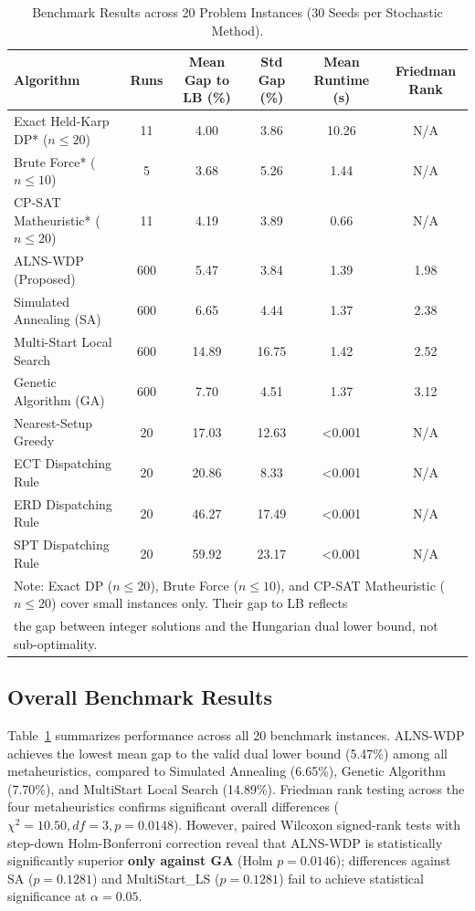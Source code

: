 \documentclass[journal]{IEEEtran}
\begin{document}
\begin{table}[htbp]
\centering
\small
\caption{Benchmark Results across 20 Problem Instances (30 Seeds per Stochastic Method).}
\label{tab:benchmarks}
\begin{tabular}{lccccc}
\toprule
\textbf{Algorithm} & \textbf{Runs} & \textbf{Mean Gap to LB (\%)} & \textbf{Std Gap (\%)} & \textbf{Mean Runtime (s)} & \textbf{Friedman Rank} \\
\midrule
Exact Held-Karp DP* ($n \le 20$) & 11 & 4.00 & 3.86 & 10.26 & N/A \\
Brute Force* ($n \le 10$) & 5 & 3.68 & 5.26 & 1.44 & N/A \\
CP-SAT Matheuristic* ($n \le 20$) & 11 & 4.19 & 3.89 & 0.66 & N/A \\
ALNS-WDP (Proposed) & 600 & 5.47 & 3.84 & 1.39 & 1.98 \\
Simulated Annealing (SA) & 600 & 6.65 & 4.44 & 1.37 & 2.38 \\
Multi-Start Local Search & 600 & 14.89 & 16.75 & 1.42 & 2.52 \\
Genetic Algorithm (GA) & 600 & 7.70 & 4.51 & 1.37 & 3.12 \\
Nearest-Setup Greedy & 20 & 17.03 & 12.63 & <0.001 & N/A \\
ECT Dispatching Rule & 20 & 20.86 & 8.33 & <0.001 & N/A \\
ERD Dispatching Rule & 20 & 46.27 & 17.49 & <0.001 & N/A \\
SPT Dispatching Rule & 20 & 59.92 & 23.17 & <0.001 & N/A \\
\bottomrule
\multicolumn{6}{l}{\footnotesize *Note: Exact DP ($n \le 20$), Brute Force ($n \le 10$), and CP-SAT Matheuristic ($n \le 20$) cover small instances only. Their gap to LB reflects}\\
\multicolumn{6}{l}{\footnotesize the gap between integer solutions and the Hungarian dual lower bound, not sub-optimality.}\\
\end{tabular}
\end{table}

\subsection{Overall Benchmark Results}
Table~\ref{tab:benchmarks} summarizes performance across all 20 benchmark instances. ALNS-WDP achieves the lowest mean gap to the valid dual lower bound (5.47\%) among all metaheuristics, compared to Simulated Annealing (6.65\%), Genetic Algorithm (7.70\%), and MultiStart Local Search (14.89\%). Friedman rank testing across the four metaheuristics confirms significant overall differences ($\chi^2 = 10.50, df = 3, p = 0.0148$). However, paired Wilcoxon signed-rank tests with step-down Holm-Bonferroni correction reveal that ALNS-WDP is statistically significantly superior \textbf{only against GA} (Holm $p = 0.0146$); differences against SA ($p = 0.1281$) and MultiStart\_LS ($p = 0.1281$) fail to achieve statistical significance at $\alpha = 0.05$.
\end{document}
